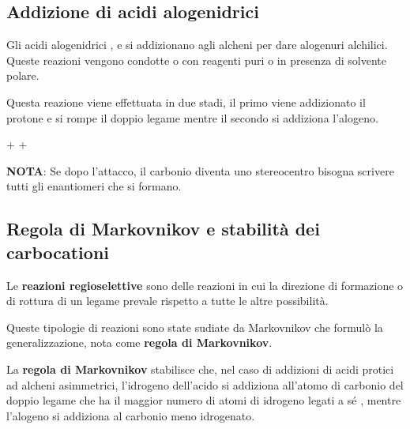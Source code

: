 \subsection{Addizione di acidi alogenidrici}
Gli acidi alogenidrici ,  e  si addizionano agli alcheni per dare alogenuri alchilici. Queste reazioni vengono condotte o con reagenti puri o in presenza di solvente polare.

Questa reazione viene effettuata in due stadi, il primo viene addizionato il protone e si rompe il doppio legame mentre il secondo si addiziona l'alogeno.

\begingroup
{}
\begin{reaction}
	 + 
	\arrow
	 + 
	\arrow
\end{reaction}
\endgroup

\begin{framed}
	\textbf{NOTA}: Se dopo l'attacco, il carbonio diventa uno stereocentro bisogna scrivere tutti gli enantiomeri che si formano.
\end{framed}


\subsection{Regola di Markovnikov e stabilità dei carbocationi}
Le \textbf{reazioni regioselettive} sono delle reazioni in cui la direzione di formazione o di rottura di un legame prevale rispetto a tutte le altre possibilità.

Queste tipologie di reazioni sono state sudiate da Markovnikov che formulò la generalizzazione, nota come \textbf{regola di Markovnikov}.

La \textbf{regola di Markovnikov} stabilisce che, nel caso di addizioni di acidi protici  ad alcheni asimmetrici, l'idrogeno dell'acido si addiziona all'atomo di carbonio del doppio legame che ha il maggior numero di atomi di idrogeno legati a sé , mentre l'alogeno si addiziona al carbonio meno idrogenato.

